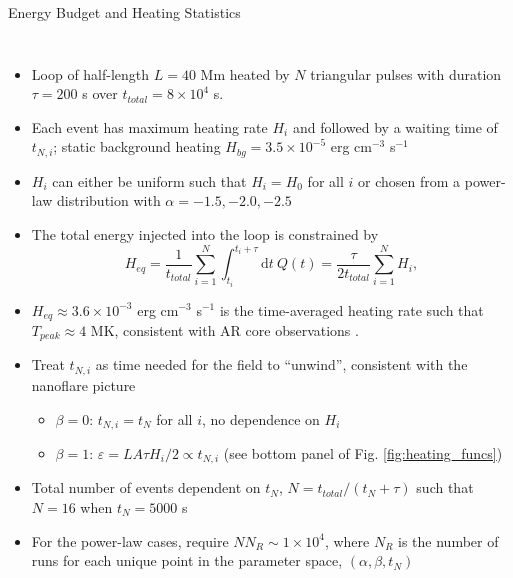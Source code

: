 \documentclass[final]{beamer}
\begin{document}
\begin{frame}
\begin{columns}[t]
\begin{column}{0.49\linewidth}
\begin{block}{Energy Budget and Heating Statistics}
\begin{columns}[T]
\begin{column}{0.49\columnwidth}
\begin{figure}
          \label{fig:parameter_space}
        \end{figure}
        \vspace{-2ex}
      \end{column}
      \end{columns}
      \begin{itemize}
        \item Loop of half-length $L=40$ Mm heated by $N$ triangular pulses with duration $\tau=200$ s over $t_{total}=8\times10^4$ s.
        \item Each event has maximum heating rate $H_i$ and followed by a waiting time of $t_{N,i}$; static background heating $H_{bg}=3.5\times10^{-5}$ erg cm$^{-3}$ s$^{-1}$
        \item $H_i$ can either be uniform such that $H_i=H_0$ for all $i$ or chosen from a power-law distribution with $\alpha=-1.5,-2.0,-2.5$
        \item The total energy injected into the loop is constrained by
          \begin{equation}
            H_{eq} = \frac{1}{t_{total}}\sum_{i=1}^N\int_{t_i}^{t_i+\tau}\mathrm{d}t~Q(t) = \frac{\tau}{2t_{total}}\sum_{i=1}^NH_i,
          \end{equation}
        \item $H_{eq}\approx3.6\times10^{-3}$ erg cm$^{-3}$ s$^{-1}$ is the time-averaged heating rate such that $T_{peak}\approx4$ MK, consistent with AR core observations \citep{warren_systematic_2012}.
        \item Treat $t_{N,i}$ as time needed for the field to ``unwind'', consistent with the \citet{parker_nanoflares_1988} nanoflare picture
        \begin{itemize}
          \item $\beta=0$: $t_{N,i}=t_N$ for all $i$, no dependence on $H_i$
          \item $\beta=1$: $\varepsilon=LA\tau H_i/2\propto t_{N,i}$ (see bottom panel of Fig. \ref{fig:heating_funcs})
        \end{itemize}
        \item Total number of events dependent on $t_N$, $N=t_{total}/(t_N + \tau)$ such that $N=16$ when $t_N=5000$ s
        \item For the power-law cases, require $NN_R\sim1\times10^4$, where $N_R$ is the number of runs for each unique point in the parameter space, $(\alpha,\beta,t_N)$
      \end{itemize}
    \end{block}

\end{column}
\end{columns}
\end{frame}
\end{document}

